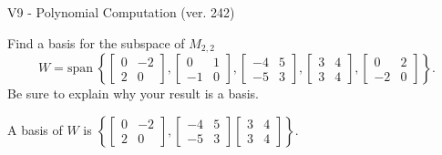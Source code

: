 \begin{exercise}
  \begin{exerciseTitle}V9 - Polynomial Computation (ver. 242)\end{exerciseTitle}
  \begin{exerciseStatement}
    Find a basis for the subspace of \(M_{2,2}\) 
\[W=\mathrm{span}\ \left\{\left[\begin{array}{cc}
0 & -2 \\
2 & 0
\end{array}\right] , \left[\begin{array}{cc}
0 & 1 \\
-1 & 0
\end{array}\right] , \left[\begin{array}{cc}
-4 & 5 \\
-5 & 3
\end{array}\right] , \left[\begin{array}{cc}
3 & 4 \\
3 & 4
\end{array}\right] , \left[\begin{array}{cc}
0 & 2 \\
-2 & 0
\end{array}\right]\right\}.\]
 Be sure to explain why your result is a basis.


  \end{exerciseStatement}
  \begin{exerciseAnswer}
   A basis of \(W\) is  \(\left\{\left[\begin{array}{cc}
0 & -2 \\
2 & 0
\end{array}\right] , \left[\begin{array}{cc}
-4 & 5 \\
-5 & 3
\end{array}\right] \left[\begin{array}{cc}
3 & 4 \\
3 & 4
\end{array}\right]\right\}\).
  


  \end{exerciseAnswer}
\end{exercise}